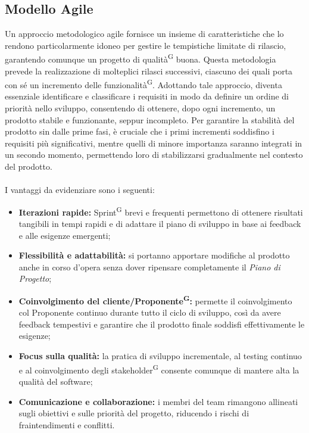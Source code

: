 \documentclass[8pt]{article}
\newcommand{\glossterm}[1]{#1\textsuperscript{G}} %
\begin{document}
\subsection{Modello Agile}
Un approccio metodologico agile fornisce un insieme di caratteristiche che lo rendono particolarmente idoneo per gestire le tempistiche limitate di rilascio, garantendo comunque un progetto di \glossterm{qualità} buona.
Questa metodologia prevede la realizzazione di molteplici rilasci successivi, ciascuno dei quali porta con sé un incremento delle \glossterm{funzionalità}. Adottando tale approccio, diventa essenziale identificare e classificare i requisiti in modo da definire un ordine di priorità nello sviluppo, consentendo di ottenere, dopo ogni incremento, un prodotto stabile e funzionante, seppur incompleto. Per garantire la stabilità del prodotto sin dalle prime fasi, è cruciale che i primi incrementi soddisfino i requisiti più significativi, mentre quelli di minore importanza saranno integrati in un secondo momento, permettendo loro di stabilizzarsi gradualmente nel contesto del prodotto.
\\\\
I vantaggi da evidenziare sono i seguenti:
\begin{itemize}
\setlength\itemsep{0em}
\item
\textbf{Iterazioni rapide:} \glossterm{Sprint} brevi e frequenti permettono di ottenere risultati tangibili in tempi rapidi e di adattare il piano di sviluppo in base ai feedback e alle esigenze emergenti;
\item
\textbf{Flessibilità e adattabilità:} si portanno apportare modifiche al prodotto anche in corso d'opera senza dover ripensare completamente il \textit{Piano di Progetto};
\item
\textbf{Coinvolgimento del cliente/\glossterm{Proponente}:} permette il coinvolgimento col Proponente continuo durante tutto il ciclo di sviluppo, così da avere feedback tempestivi e garantire che il prodotto finale soddisfi effettivamente le esigenze;
\item
\textbf{Focus sulla qualità:} la pratica di sviluppo incrementale, al testing continuo e al coinvolgimento degli \glossterm{stakeholder} consente comunque di mantere alta la qualità del software;
\item
\textbf{Comunicazione e collaborazione:} i membri del team rimangono allineati sugli obiettivi e sulle priorità del progetto, riducendo i rischi di fraintendimenti e conflitti.
\end{itemize}
\end{document}
